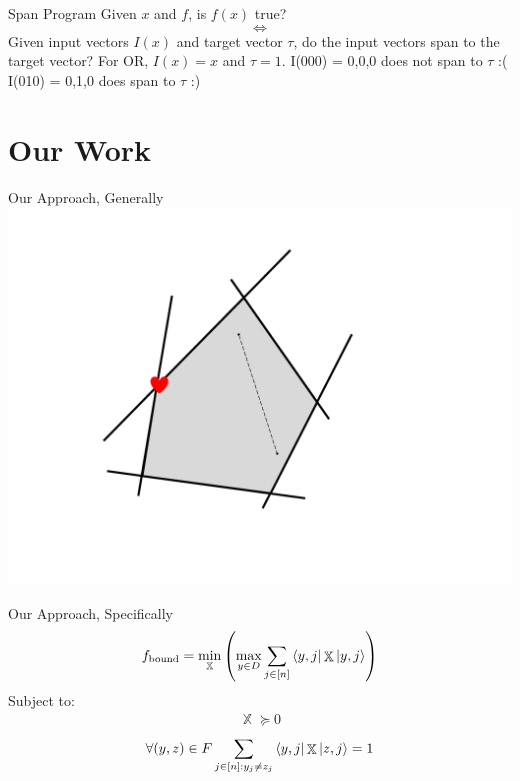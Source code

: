 \documentclass[12pt]{beamer}
\DeclareMathOperator{\X}{\mathbb{X}}		     %
\begin{document}
\begin{frame}{Span Program}
Given $x$ and $f$, is $f(x)$ true?
$$\iff$$
Given input vectors $I(x)$ and target vector $\tau$,
do the input vectors span to the target vector?
\newline
\newline
{}
{
For OR, $I(x) = x$ and $\tau = 1$.
}
\newline
\newline
{}
{
I(000) = {0,0,0} does not span to $\tau$
:(
}
{
I(010) = {0,1,0} does span to $\tau$
:)
}
\end{frame}

\section{Our Work}


\begin{frame}{Our Approach, Generally} 
\centering
\includegraphics[scale=.5]{convex_optimization.pdf}
\end{frame}

\begin{frame}{Our Approach, Specifically \cite{reichardt2009span}}
\begin{align} \label{eq:reichardtObj} 
    f_{\text{bound}} = \min_{\X} \left( \max_{y \in D} \sum_{j \in [n]}
    \bra{y,j}\X\ket{y,j}  \right) \nonumber
\end{align}
Subject to:
\begin{align}\label{Eq:reichardtSemi}
    \X \succcurlyeq 0 \nonumber
\end{align}
\begin{align}\label{Eq:reichardtOffDiag}
    \forall (y,z) \in F \sum_{j \in [n]: y_j \ne z_j} 
    \bra{y,j} \X \ket{z, j} = 1 \nonumber
\end{align}
\end{frame}
\end{document}
